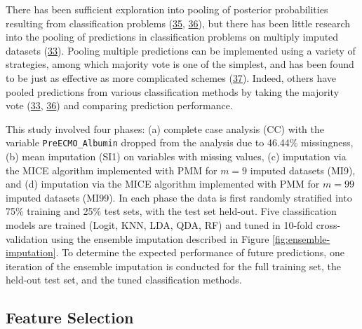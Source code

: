 \documentclass[12pt,]{article}
\begin{document}
There has been sufficient exploration into pooling of posterior
probabilities resulting from classification problems
(\protect\hyperlink{ref-kittler_combining_1996}{35},
\protect\hyperlink{ref-james_majority_1998}{36}), but there has been
little research into the pooling of predictions in classification
problems on multiply imputed datasets
(\protect\hyperlink{ref-belanche_handling_2014}{33}). Pooling multiple
predictions can be implemented using a variety of strategies, among
which majority vote is one of the simplest, and has been found to be
just as effective as more complicated schemes
(\protect\hyperlink{ref-lam_optimal_1995}{37}). Indeed, others have
pooled predictions from various classification methods by taking the
majority vote (\protect\hyperlink{ref-belanche_handling_2014}{33},
\protect\hyperlink{ref-james_majority_1998}{36}) and comparing
prediction performance.

This study involved four phases: (a) complete case analysis (CC) with
the variable \texttt{PreECMO\_Albumin} dropped from the analysis due to
46.44\% missingness, (b) mean imputation (SI1) on variables with missing
values, (c) imputation via the MICE algorithm implemented with PMM for
\(m=9\) imputed datasets (MI9), and (d) imputation via the MICE
algorithm implemented with PMM for \(m=99\) imputed datasets (MI99). In
each phase the data is first randomly stratified into 75\% training and
25\% test sets, with the test set held-out. Five classification models
are trained (Logit, KNN, LDA, QDA, RF) and tuned in 10-fold
cross-validation using the ensemble imputation described in Figure
\ref{fig:ensemble-imputation}. To determine the expected performance of
future predictions, one iteration of the ensemble imputation is
conducted for the full training set, the held-out test set, and the
tuned classification methods.

\subsection{Feature Selection}\label{feature-selection}
\end{document}

